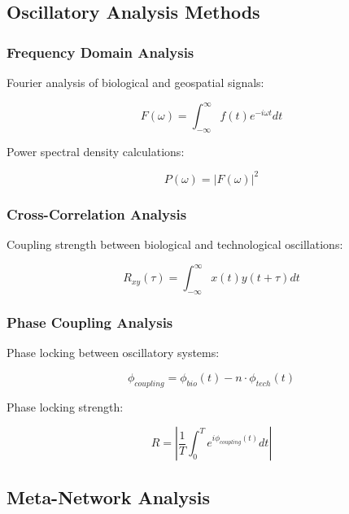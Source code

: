 \documentclass[12pt]{article}
\begin{document}
\subsection{Oscillatory Analysis Methods}

\subsubsection{Frequency Domain Analysis}

Fourier analysis of biological and geospatial signals:

\begin{equation}
F(\omega) = \int_{-\infty}^{\infty} f(t) e^{-i\omega t} dt
\end{equation}

Power spectral density calculations:

\begin{equation}
P(\omega) = |F(\omega)|^2
\end{equation}

\subsubsection{Cross-Correlation Analysis}

Coupling strength between biological and technological oscillations:

\begin{equation}
R_{xy}(\tau) = \int_{-\infty}^{\infty} x(t)y(t+\tau) dt
\end{equation}

\subsubsection{Phase Coupling Analysis}

Phase locking between oscillatory systems:

\begin{equation}
\phi_{coupling} = \phi_{bio}(t) - n \cdot \phi_{tech}(t)
\end{equation}

Phase locking strength:

\begin{equation}
R = \left|\frac{1}{T}\int_0^T e^{i\phi_{coupling}(t)} dt\right|
\end{equation}

\subsection{Meta-Network Analysis}
\end{document}
